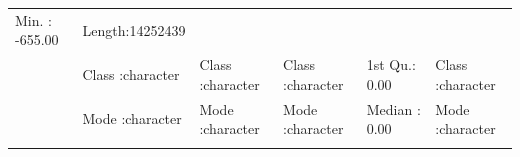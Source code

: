\documentclass[]{article}
\begin{document}
\begin{longtable}[]{@{}llllll@{}}
\begin{minipage}[t]{0.16\columnwidth}
Min. : -655.00\strut
\end{minipage} & \begin{minipage}[t]{0.16\columnwidth}\raggedright\strut
Length:14252439\strut
\end{minipage}\tabularnewline
\begin{minipage}[t]{0.04\columnwidth}\raggedright\strut
\strut
\end{minipage} & \begin{minipage}[t]{0.16\columnwidth}\raggedright\strut
Class :character\strut
\end{minipage} & \begin{minipage}[t]{0.16\columnwidth}\raggedright\strut
Class :character\strut
\end{minipage} & \begin{minipage}[t]{0.16\columnwidth}\raggedright\strut
Class :character\strut
\end{minipage} & \begin{minipage}[t]{0.16\columnwidth}\raggedright\strut
1st Qu.: 0.00\strut
\end{minipage} & \begin{minipage}[t]{0.16\columnwidth}\raggedright\strut
Class :character\strut
\end{minipage}\tabularnewline
\begin{minipage}[t]{0.04\columnwidth}\raggedright\strut
\strut
\end{minipage} & \begin{minipage}[t]{0.16\columnwidth}\raggedright\strut
Mode :character\strut
\end{minipage} & \begin{minipage}[t]{0.16\columnwidth}\raggedright\strut
Mode :character\strut
\end{minipage} & \begin{minipage}[t]{0.16\columnwidth}\raggedright\strut
Mode :character\strut
\end{minipage} & \begin{minipage}[t]{0.16\columnwidth}\raggedright\strut
Median : 0.00\strut
\end{minipage} & \begin{minipage}[t]{0.16\columnwidth}\raggedright\strut
Mode :character\strut
\end{minipage}\tabularnewline
\begin{minipage}[t]{0.04\columnwidth}\raggedright\strut
\strut
\end{minipage} & \begin{minipage}[t]{0.16\columnwidth}\raggedright\strut

\end{minipage}
\end{longtable}
\end{document}
